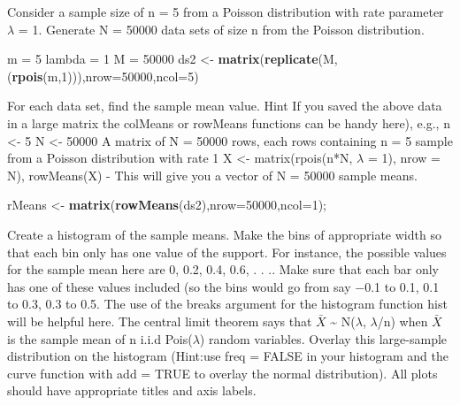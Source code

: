 \documentclass[
]{article}
\newenvironment{Shaded}{\begin{snugshade}}{\end{snugshade}}
\newcommand{\DataTypeTok}[1]{\textcolor[rgb]{0.13,0.29,0.53}{#1}}
\newcommand{\DecValTok}[1]{\textcolor[rgb]{0.00,0.00,0.81}{#1}}
\newcommand{\KeywordTok}[1]{\textcolor[rgb]{0.13,0.29,0.53}{\textbf{#1}}}
\newcommand{\NormalTok}[1]{#1}
\newcommand{\StringTok}[1]{\textcolor[rgb]{0.31,0.60,0.02}{#1}}
\begin{document}
Consider a sample size of n = 5 from a Poisson distribution with rate
parameter \(\lambda\) = 1. Generate N = 50000 data sets of size n from
the Poisson distribution.

\begin{Shaded}
\begin{Highlighting}[]
\NormalTok{m =}\StringTok{ }\DecValTok{5}
\NormalTok{lambda =}\StringTok{ }\DecValTok{1}
\NormalTok{M =}\StringTok{ }\DecValTok{50000}
\NormalTok{ds2 <-}\StringTok{ }\KeywordTok{matrix}\NormalTok{(}\KeywordTok{replicate}\NormalTok{(M,(}\KeywordTok{rpois}\NormalTok{(m,}\DecValTok{1}\NormalTok{))),}\DataTypeTok{nrow=}\DecValTok{50000}\NormalTok{,}\DataTypeTok{ncol=}\DecValTok{5}\NormalTok{)}
\end{Highlighting}
\end{Shaded}

For each data set, find the sample mean value. Hint If you saved the
above data in a large matrix the colMeans or rowMeans functions can be
handy here), e.g., n \textless- 5 N \textless- 50000 A matrix of N =
50000 rows, each rows containing n = 5 sample from a Poisson
distribution with rate 1 X \textless- matrix(rpois(n*N, \(\lambda\) =
1), nrow = N), rowMeans(X) - This will give you a vector of N = 50000
sample means.

\begin{Shaded}
\begin{Highlighting}[]
\NormalTok{rMeans <-}\StringTok{ }\KeywordTok{matrix}\NormalTok{(}\KeywordTok{rowMeans}\NormalTok{(ds2),}\DataTypeTok{nrow=}\DecValTok{50000}\NormalTok{,}\DataTypeTok{ncol=}\DecValTok{1}\NormalTok{);}
\end{Highlighting}
\end{Shaded}

Create a histogram of the sample means. Make the bins of appropriate
width so that each bin only has one value of the support. For instance,
the possible values for the sample mean here are 0, 0.2, 0.4, 0.6, . .
.. Make sure that each bar only has one of these values included (so the
bins would go from say −0.1 to 0.1, 0.1 to 0.3, 0.3 to 0.5. The use of
the breaks argument for the histogram function hist will be helpful
here. The central limit theorem says that \(\bar{X}\) \textasciitilde{}
N(\(\lambda\), \(\lambda\)/n) when \(\bar{X}\) is the sample mean of n
i.i.d Pois(\(\lambda\)) random variables. Overlay this large-sample
distribution on the histogram (Hint:use freq = FALSE in your histogram
and the curve function with add = TRUE to overlay the normal
distribution). All plots should have appropriate titles and axis labels.
\end{document}
